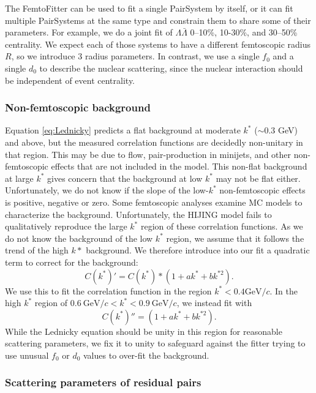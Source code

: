 The FemtoFitter can be used to fit a single PairSystem by itself, or it can fit multiple PairSystems at the same type and constrain them to share some of their parameters.
For example, we do a joint fit of $\Lambda\bar{\Lambda}$ 0--10\%, 10-30\%, and 30--50\% centrality.  
We expect each of those systems to have a different femtoscopic radius $R$, so we introduce 3 radius parameters. 
In contrast, we use a single $f_0$ and a single $d_0$ to describe the nuclear scattering, since the nuclear interaction should be independent of event centrality.

\subsubsection{Non-femtoscopic background}

Equation \ref{eq:Lednicky} predicts a flat background at moderate $k^*$ ($\sim 0.3$ GeV) and above, but the measured correlation functions are decidedly non-unitary in that region.  
This may be due to flow, pair-production in minijets, and other non-femtoscopic effects that are not included in the model.
This non-flat background at large $k^*$ gives concern that the background at low $k^*$ may not be flat either.
Unfortunately, we do not know if the slope of the low-$k^*$ non-femtoscopic effects is positive, negative or zero.
Some femtoscopic analyses examine MC models to characterize the background.
Unfortunately, the HIJING model fails to qualitatively reproduce the large $k^*$ region of these correlation functions.
As we do not know the background of the low $k^*$ region, we assume that it follows the trend of the high $k*$ background.
We therefore introduce into our fit a quadratic term to correct for the background:
\begin{equation}
\label{eq:BkgParams}
C(k^*)' = C(k^*) * (1 + ak^* + bk^{*2}).
\end{equation}
We use this to fit the correlation function in the region $k^* <  0.4 \mathrm{GeV}/c$. 
In the high $k^*$ region of $0.6\ \mathrm{GeV}/c < k^* < 0.9\ \mathrm{GeV}/c$, we instead fit with 
\begin{equation}
\label{eq:HighBackgroundFit}
C(k^*)'' = (1 + ak^* + bk^{*2}).
\end{equation}
While the Lednicky equation should be unity in this region for reasonable scattering parameters, we fix it to unity to safeguard against the fitter trying to use unusual $f_0$ or $d_0$ values to over-fit the background.

\subsubsection{Scattering parameters of residual pairs}
\label{sec:ScatteringParams}

